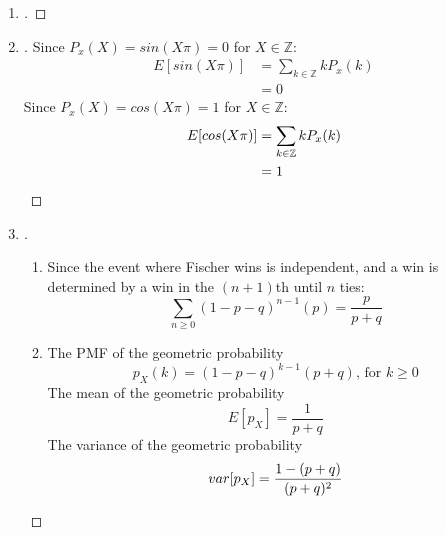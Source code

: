 \documentclass[paper=usletter, fontsize=12pt]{article}
\begin{document}
\begin{enumerate}
        \item
        \begin{proof}[\unskip\nopunct]
        \end{proof}
        \vspace{0.2in}

        \item
        \begin{proof}[\unskip\nopunct]
            Since $P_x(X) = sin(X\pi) = 0$ for $X \in \mathbb{Z}$:
            \begin{align*}
                E[sin(X\pi)] & = \sum_{k \in \mathbb{Z}} kP_x(k)\\
                & = 0
            \end{align*}
            Since $P_x(X) = cos(X\pi) = 1$ for $X \in \mathbb{Z}$:
            \begin{align*}
                E[cos(X\pi)] & = \sum_{k \in \mathbb{Z}} kP_x(k)\\
                & = 1 \qedhere
            \end{align*}
        \end{proof}
        \vspace{0.2in}

        \item
        \begin{proof}[\unskip\nopunct]
            \begin{enumerate}

                \item Since the event where Fischer wins is independent, and a
                win is determined by a win in the $(n+1)$th until $n$ ties:
                \begin{equation*}
                    \sum_{n \ge 0} (1-p-q)^{n-1}(p) = \frac{p}{p+q}
                \end{equation*}

                \item The PMF of the geometric probability
                \begin{equation*}
                    p_X(k) = (1-p-q)^{k-1}(p+q) \text{, for } k \ge 0
                \end{equation*}
                The mean of the geometric probability
                \begin{equation*}
                    E[p_X] = \frac{1}{p+q}
                \end{equation*}
                The variance of the geometric probability
                \begin{equation*}
                    var[p_X] = \frac{1-(p+q)}{(p+q)^2} \qedhere
                \end{equation*}


\end{enumerate}
\end{proof}
\end{enumerate}
\end{document}
